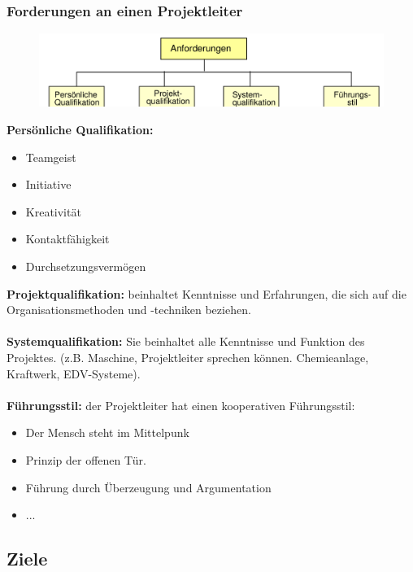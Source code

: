 \documentclass[11pt,a4paper]{article}
\begin{document}
\subsubsection{Forderungen an einen Projektleiter}
\begin{figure}[H]
	\centering

	\includegraphics[width=\textwidth]{forderungen}

\end{figure}	

\textbf{Persönliche Qualifikation:} 
\begin{itemize}
\itemsep0em
	\item Teamgeist
	\item Initiative
	\item Kreativität
	\item Kontaktfähigkeit
	\item Durchsetzungsvermögen
\end{itemize}
\noindent
\textbf{Projektqualifikation:} beinhaltet Kenntnisse und Erfahrungen,
die sich auf die Organisationsmethoden
und -techniken beziehen.
\\
\\
\textbf{Systemqualifikation:} Sie beinhaltet alle Kenntnisse und
Funktion des Projektes. (z.B. Maschine,
Projektleiter sprechen können.
Chemieanlage, Kraftwerk, EDV-Systeme).
\\
\\
\textbf{Führungsstil:} der Projektleiter hat einen kooperativen Führungsstil:
\begin{itemize}
\item Der Mensch steht im Mittelpunk
\item Prinzip der offenen Tür.
\item Führung durch Überzeugung und Argumentation
\item ...
\end{itemize}
\subsection{Ziele}
\end{document}
